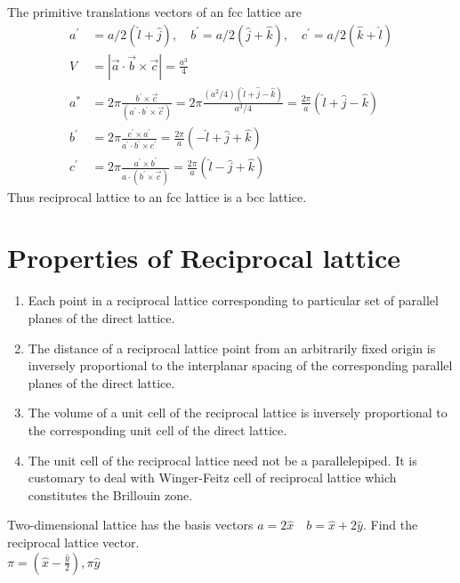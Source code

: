 The primitive translations vectors of an fcc lattice are
\begin{align*}
a^{\prime}&=a / 2(\hat{l}+\hat{j}), \quad b^{\prime}=a / 2(\hat{j}+\hat{k}), \quad  c^{\prime}=a / 2(\hat{k}+\hat{l})  \\
V&=|\vec{a} \cdot \vec{b} \times \vec{c}|=\frac{a^{3}}{4}\\
a^{*}&=2 \pi \frac{b^{\prime} \times \vec{c}}{\left(a^{\prime} \cdot b^{\prime} \times \vec{c}\right)}=2 \pi \frac{\left(a^{2} / 4\right)(\hat{l}+\hat{j}-\hat{k})}{a^{3} / 4}=\frac{2 \pi}{a}(\hat{l}+\hat{j}-\hat{k}) \\
b^{\prime}&=2 \pi \frac{c^{\prime} \times a^{\prime}}{a^{\prime} \cdot b^{\prime} \times c^{\prime}}=\frac{2 \pi}{a}(-\hat{l}+\hat{j}+\hat{k})\\
c^{\prime}&=2 \pi \frac{a^{\prime} \times b^{\prime}}{a \cdot\left(b^{\prime} \times \vec{c}\right)}=\frac{2 \pi}{a}(\hat{l}-\hat{j}+\hat{k})
\end{align*}
Thus reciprocal lattice to an fcc lattice is a bcc lattice.

\section{Properties of Reciprocal lattice}
\begin{enumerate}
	\item Each point in a reciprocal lattice corresponding to particular set of parallel planes of the direct lattice.
	\item The distance of a reciprocal lattice point from an arbitrarily fixed origin is inversely proportional to the interplanar spacing of the corresponding parallel planes of the direct lattice.
	\item The volume of a unit cell of the reciprocal lattice is inversely proportional to the corresponding unit cell of the direct lattice.
	\item The unit cell of the reciprocal lattice need not be a parallelepiped. It is customary to deal with Winger-Feitz cell of reciprocal lattice which constitutes the Brillouin zone.
\end{enumerate}
\begin{example}
	 Two-dimensional lattice has the basis vectors $a=2 \hat{x} \quad b=\hat{x}+2 \hat{y}$. Find the reciprocal lattice vector.\\
	 $\pi=\left(\hat{x}-\frac{\hat{y}}{2}\right), \pi \hat{y}$
\end{example}

